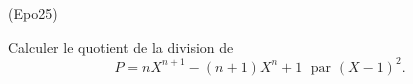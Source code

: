 \begin{tiny}(Epo25)\end{tiny} Calculer le quotient de la division de 
\begin{displaymath}
 P = nX^{n+1}-(n+1)X^n+1 \; \text{ par } (X-1)^2.
\end{displaymath}
